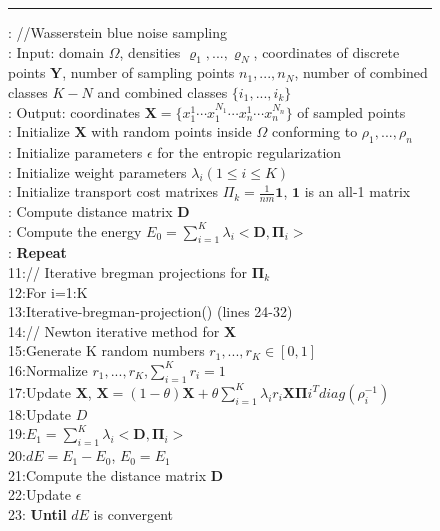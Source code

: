 \begin{figure}[htb]
\rule{0.5\textwidth}{0.4pt}
 : //Wasserstein blue noise sampling\\
: Input: domain $\Omega$, densities $\varrho_1,...,\varrho_N$, coordinates of discrete points $\mathbf{Y}$,
  number of sampling points $n_1,...,n_N$,
  number of combined classes $K-N$ and combined classes $\{i_1,...,i_k\}$\\
: Output: coordinates $\mathbf{X}=\{x_1^1 \cdots  x_1^{N_1} \cdots x_n^1 \cdots x_n^{N_n}\}$  of sampled points\\
: Initialize $\mathbf{X}$ with random points inside $\Omega$ conforming to $\rho_1,...,\rho_n$ \\
: Initialize parameters $\epsilon$ for the entropic regularization\\
: Initialize weight parameters $\lambda_i(1\leq i \leq K)$\\
: Initialize transport cost matrixes $\Pi_k=\frac{1}{nm}\mathbf{1}$, $\mathbf{1}$ is an all-1 matrix\\
: Compute distance matrix $\mathbf D$\\
: Compute the energy $E_0=\sum_{i=1}^K\lambda_i<\mathbf D,\mathbf{\Pi}_i>$\\
: \textbf{Repeat}\\
11:\quad // Iterative bregman projections for $\mathbf{\Pi}_k$\\
12:\quad For i=1:K \\
13:\quad \quad  Iterative-bregman-projection() (lines 24-32) \\
14:\quad // Newton iterative method for $\mathbf{X}$ \\
15:\quad Generate K random numbers $r_1,...,r_K\in[0,1]$\\
16:\quad Normalize $r_1,...,r_K$,$\sum_{i=1}^Kr_i=1$\\
17:\quad Update $\mathbf X$, $\mathbf X=(1-\theta)\mathbf X+\theta\sum_{i=1}^K\lambda_ir_i\mathbf{X}\mathbf{\Pi}i^Tdiag({\rho_i^{-1}})$\\
18:\quad Update $D$\\
19:\quad $E_1=\sum_{i=1}^K\lambda_i<\mathbf{D},\mathbf{\Pi}_i>$ \\
20:\quad $dE=E_1-E_0$, $E_0=E_1$\\
21:\quad Compute the distance matrix $\mathbf{D}$ \\
22:\quad Update $\epsilon$ \\
23: \textbf{Until} $dE$ is convergent \\


\end{figure}
